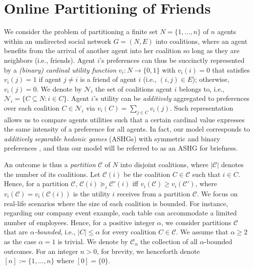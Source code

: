 \documentclass[letterpaper]{article}
\begin{document}
\section{Online Partitioning of Friends}
\label{sec:Online Partitioning of Friends}
We consider the problem of partitioning a finite set $N = \{1, \dots, n\}$ of $n$ agents within an undirected social network $G = (N, E)$ into coalitions, where an agent benefits from the arrival of another agent into her coalition so long as they are neighbors (i.e., friends). %
Agent $i$'s preferences can thus be succinctly represented by a \textit{(binary) cardinal utility function} $v_i: N \rightarrow \{0,1\}$ with $v_i(i) = 0$ that satisfies $v_i(j) = 1$ if agent $j \neq i$ is a friend of agent $i$ (i.e., $(i,j) \in E$); otherwise, $v_i(j) = 0$. We denote by $\mathcal{N}_i$ the set of coalitions agent $i$ belongs to, i.e., $\mathcal{N}_i = \{C \subseteq N : i \in C\}$. Agent $i$'s utility can be \textit{additively} aggregated to preferences over each coalition $C \in \mathcal{N}_i$ via $v_i(C) = \sum_{j \in C} v_i(j)$. Such representation allows us to compare agents utilities such that a certain cardinal value expresses the same intensity of a preference for all agents. In fact, our model corresponds to \textit{additively separable hedonic games} (ASHGs) with symmetric and binary preferences \cite{bullinger2020pareto}, and thus our model will be referred to as an ASHG for briefness. %



An outcome is thus a \textit{partition} $\mathcal{C}$ of $N$ into disjoint coalitions, where $|\mathcal{C}|$ denotes the number of its coalitions. Let $\mathcal{C}(i)$ be the coalition $C \in \mathcal{C}$ such that $i \in C$. Hence, for a partition $\mathcal{C}$, $\mathcal{C}(i) \succeq_i \mathcal{C}'(i)$ iff $v_i(\mathcal{C}) \geq v_i(\mathcal{C}')$, where $v_i(\mathcal{C}) = v_i(\mathcal{C}(i))$ is the utility $i$ receives from a partition $\mathcal{C}$. We focus on real-life scenarios where the size of each coalition is bounded. For instance, regarding our company event example, each table can accommodate a limited number of employees. Hence, for a positive integer $\alpha$, we consider partitions $\mathcal{C}$ that are \textit{$\alpha$-bounded}, i.e., $|C| \leq \alpha$ for every coalition $C \in \mathcal{C}$. We assume that $\alpha \geq 2$ as the case $\alpha=1$ is trivial. We denote by $\mathscr{C}_{\alpha}$ the collection of all $\alpha$-bounded outcomes. For an integer $n > 0$, for brevity, we henceforth denote $[n] := \{1,\dots,n\}$ where $[0] = \{0\}$.
\end{document}
